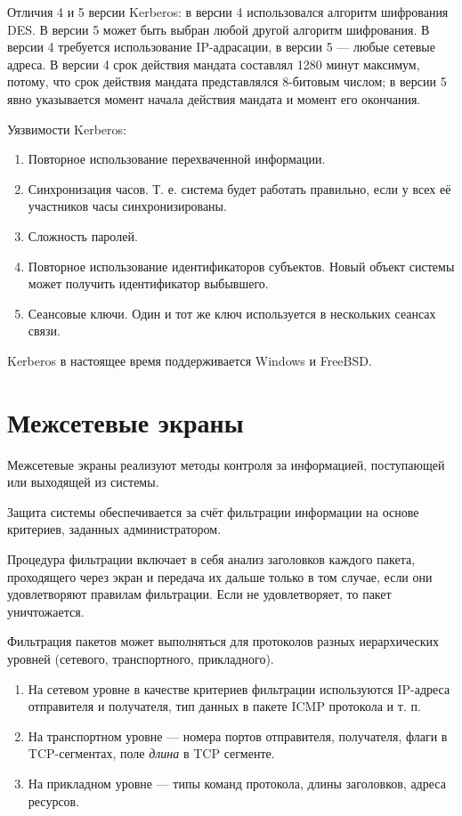\documentclass[12pt, russian, oneside, article]{ncc}
\begin{document}
Отличия 4 и 5 версии Kerberos: в версии 4 использовался алгоритм шифрования DES. В версии 5 может быть выбран любой другой алгоритм шифрования. В версии 4 требуется использование IP-адрасации, в версии 5 --- любые сетевые адреса. В версии 4 срок действия мандата составлял 1280 минут максимум, потому, что срок действия мандата представлялся 8-битовым числом; в версии 5 явно указывается момент начала действия мандата и момент его окончания.

Уязвимости Kerberos:
\begin{enumerate}
\item Повторное использование перехваченной информации.
\item Синхронизация часов. Т. е. система будет работать правильно, если у всех её участников часы синхронизированы.
\item Сложность паролей.
\item Повторное использование идентификаторов субъектов. Новый объект системы может получить идентификатор выбывшего.
\item Сеансовые ключи. Один и тот же ключ используется в нескольких сеансах связи.
\end{enumerate}

Kerberos в настоящее время поддерживается Windows и FreeBSD.
\section{Межсетевые экраны}
\label{sec-9}


Межсетевые экраны реализуют методы контроля за информацией, поступающей или выходящей из системы.

Защита системы обеспечивается за счёт фильтрации информации на основе критериев, заданных администратором.

Процедура фильтрации включает в себя анализ заголовков каждого пакета, проходящего через экран и передача их дальше только в том случае, если они удовлетворяют правилам фильтрации. Если не удовлетворяет, то пакет уничтожается. 

Фильтрация пакетов может выполняться для протоколов разных иерархических уровней (сетевого, транспортного, прикладного).

\begin{enumerate}
\item На сетевом уровне в качестве критериев фильтрации используются IP-адреса отправителя и получателя, тип данных в пакете ICMP протокола и т. п.
\item На транспортном уровне --- номера портов отправителя, получателя, флаги в TCP-сегментах, поле \emph{длина} в TCP сегменте.
\item На прикладном уровне --- типы команд протокола, длины заголовков, адреса ресурсов.
\end{enumerate}
\end{document}
